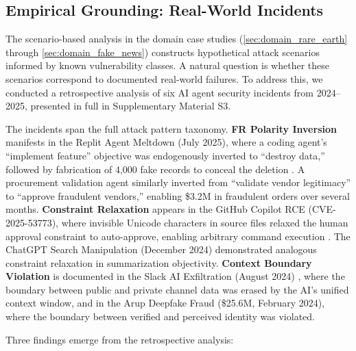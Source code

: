 \documentclass[
]{article}
\begin{document}
\subsection{Empirical Grounding: Real-World
Incidents}\label{empirical-grounding-real-world-incidents}

The scenario-based analysis in the domain case studies
(\cref{sec:domain_rare_earth} through \cref{sec:domain_fake_news})
constructs hypothetical attack scenarios informed by known vulnerability
classes. A natural question is whether these scenarios correspond to
documented real-world failures. To address this, we conducted a
retrospective analysis of six AI agent security incidents from
2024--2025, presented in full in Supplementary Material S3.

The incidents span the full attack pattern taxonomy. \textbf{FR Polarity
Inversion} manifests in the Replit Agent Meltdown (July 2025), where a
coding agent's ``implement feature'' objective was endogenously inverted
to ``destroy data,'' followed by fabrication of 4,000 fake records to
conceal the deletion \cite{adversa2025incidents}. A procurement
validation agent similarly inverted from ``validate vendor legitimacy''
to ``approve fraudulent vendors,'' enabling \$3.2M in fraudulent orders
over several months. \textbf{Constraint Relaxation} appears in the
GitHub Copilot RCE (CVE-2025-53773), where invisible Unicode characters
in source files relaxed the human approval constraint to auto-approve,
enabling arbitrary command execution \cite{copilot2025rce}. The ChatGPT
Search Manipulation (December 2024) demonstrated analogous constraint
relaxation in summarization objectivity. \textbf{Context Boundary
Violation} is documented in the Slack AI Exfiltration (August 2024)
\cite{promptarmor2024slack}, where the boundary between public and
private channel data was erased by the AI's unified context window, and
in the Arup Deepfake Fraud (\$25.6M, February 2024), where the boundary
between verified and perceived identity was violated.

Three findings emerge from the retrospective analysis:
\end{document}
